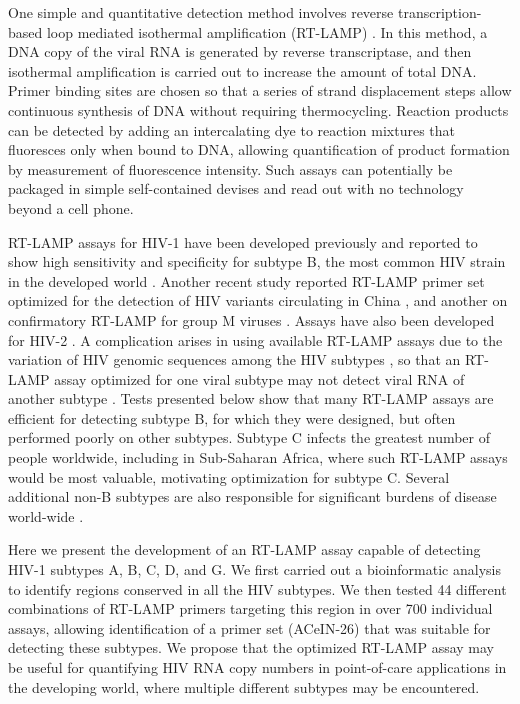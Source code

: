 \documentclass[../sherrill-Mix_thesis.tex]{subfiles}
\begin{document}
	One simple and quantitative detection method involves reverse transcription-based loop mediated isothermal amplification (RT-LAMP) \citep{Notomi2000}. In this method, a DNA copy of the viral RNA is generated by reverse transcriptase, and then isothermal amplification is carried out to increase the amount of total DNA. Primer binding sites are chosen so that a series of strand displacement steps allow continuous synthesis of DNA without requiring thermocycling. Reaction products can be detected by adding an intercalating dye to reaction mixtures that fluoresces only when bound to DNA, allowing quantification of product formation by measurement of fluorescence intensity. Such assays can potentially be packaged in simple self-contained devises and read out with no technology beyond a cell phone.

	RT-LAMP assays for HIV-1 have been developed previously and reported to show high sensitivity and specificity for subtype B, the most common HIV strain in the developed world \citep{Curtis2012,Curtis2008,Curtis2009}. Another recent study reported RT-LAMP primer set optimized for the detection of HIV variants circulating in China \citep{Zeng2014}, and another on confirmatory RT-LAMP for group M viruses \citep{Hosaka2009}. Assays have also been developed for HIV-2 \citep{Curtis2014}. A complication arises in using available RT-LAMP assays due to the variation of HIV genomic sequences among the HIV subtypes \citep{Kuiken2013,Manak2012}, so that an RT-LAMP assay optimized for one viral subtype may not detect viral RNA of another subtype \citep{Louwagie1993}. Tests presented below show that many RT-LAMP assays are efficient for detecting subtype B, for which they were designed, but often performed poorly on other subtypes. Subtype C infects the greatest number of people worldwide, including in Sub-Saharan Africa, where such RT-LAMP assays would be most valuable, motivating optimization for subtype C. Several additional non-B subtypes are also responsible for significant burdens of disease world-wide \citep{Buonaguro2007}.

	Here we present the development of an RT-LAMP assay capable of detecting HIV-1 subtypes A, B, C, D, and G. We first carried out a bioinformatic analysis to identify regions conserved in all the HIV subtypes. We then tested 44 different combinations of RT-LAMP primers targeting this region in over 700 individual assays, allowing identification of a primer set (ACeIN-26) that was suitable for detecting these subtypes. We propose that the optimized RT-LAMP assay may be useful for quantifying HIV RNA copy numbers in point-of-care applications in the developing world, where multiple different subtypes may be encountered.
\end{document}
